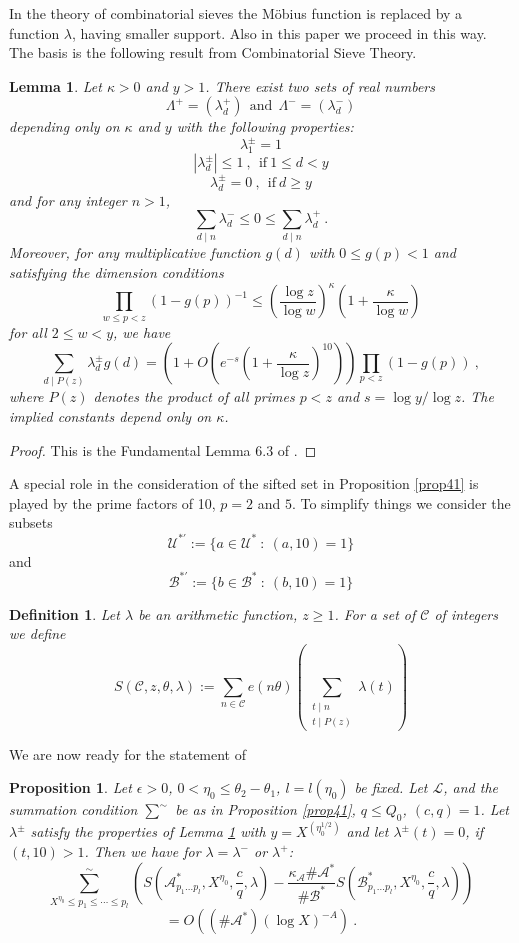 \documentclass{amsart}
\newtheorem{lemma}[theorem]{Lemma}
\newtheorem{proposition}[theorem]{Proposition}
\numberwithin{equation}{subsection}
\newtheorem{definition}[theorem]{Definition}
\begin{document}
In the theory of combinatorial sieves the M\"obius function is replaced by a function $\lambda$, having smaller support. Also in this paper we proceed in this way. The basis is the following result from Combinatorial Sieve Theory.

\begin{lemma}\label{rlem61}
Let $\kappa>0$ and $y>1$. There exist two sets of real numbers 
$$\Lambda^+=(\lambda^+_d)\ \ \text{and}\ \ \Lambda^-=(\lambda^-_d)$$
depending only on $\kappa$ and $y$ with the following properties:
\[
\lambda_1^{\pm}=1 \tag{6.1}
\]
\[
|\lambda_d^{\pm}| \leq 1\:,\ \ \text{if}\ 1\leq d< y \tag{6.2}
\]
\[
\lambda_d^{\pm}=0\:,\ \ \text{if}\ d\geq  y 
\]
and for any integer $n>1$,
\[ 
\sum_{d\mid n} \lambda_d^-  \leq 0  \leq \sum_{d\mid n} \lambda_d^+\:.  \tag{6.3}
\]
Moreover, for any multiplicative function $g(d)$ with $0\leq g(p)<1$ and satisfying the dimension conditions 
$$\prod_{w\leq p< z} (1-g(p))^{-1}\leq \left(\frac{\log z}{\log w}\right)^\kappa \left(1+\frac{\kappa}{\log w}\right)$$
for all $2\leq w< y$, we have
$$\sum_{d \mid P(z)} \lambda_d^\pm g(d)=\left(1+O\left(e^{-s}\left(1+\frac{\kappa}{\log z}\right)^{10}\right)\right)\prod_{p< z} (1-g(p))\:,$$
where $P(z)$ denotes the product of all primes $p<z$ and $s=\log y/\log z$. The implied constants depend only on $\kappa$.
\end{lemma}
\begin{proof}
This is the Fundamental Lemma 6.3 of \cite{IKW}.
\end{proof}

A special role in the consideration of the sifted set in Proposition \ref{prop41} is played by the prime factors of 10, $p=2$ and $5$. To simplify things we consider the subsets
$$\mathcal{U}^{*'}:=\{a\in \mathcal{U}^*\::\: (a, 10)=1\}$$
and
$$\mathcal{B}^{*'}:=\{ b\in \mathcal{B}^*\::\: (b, 10)=1\}$$


\begin{definition}\label{def62}
Let $\lambda$ be an arithmetic function, $z\geq 1$. For a set of $\mathcal{C}$ of integers we define 
$$S(\mathcal{C}, z, \theta, \lambda):=\sum_{n\in \mathcal{C}} e(n\theta)\left(\sum_{\substack{t\mid n \\ t\mid P(z)}} \lambda(t)\right)$$
\end{definition}
We are now ready for the statement of 

\begin{proposition}\label{prop63}
Let $\epsilon>0$, $0<\eta_0\leq \theta_2-\theta_1$, $l=l(\eta_0)$ be fixed. Let $\mathcal{L}$, and the summation condition $\sum^\sim$ be as in Proposition \ref{prop41}, $q\leq Q_0$, $(c, q)=1$. Let $\lambda^\pm$ satisfy the properties of Lemma \ref{rlem61} with $y=X^{(\eta_0^{1/2})}$ and let $\lambda^\pm(t)=0$, if $(t, 10)>1$. Then we have for $\lambda=\lambda^-$ or $\lambda^+$:
$$\sum_{X^{\eta_0}\leq p_1\leq \cdots \leq p_l}^\sim \left( S\left(\mathcal{A}^*_{p_1 \ldots p_l}, X^{\eta_0}, \frac{c}{q}, \lambda\right)-
\frac{\kappa_{\mathcal{A}}\#\mathcal{A}^*}{\#\mathcal{B}^*}  S\left(\mathcal{B}^*_{p_1 \ldots p_l}, X^{\eta_0}, \frac{c}{q}, \lambda\right)  \right)$$
$$=O\left((\#\mathcal{A}^*)(\log X)^{-A}\right)\:.$$
\end{proposition}
\end{document}
